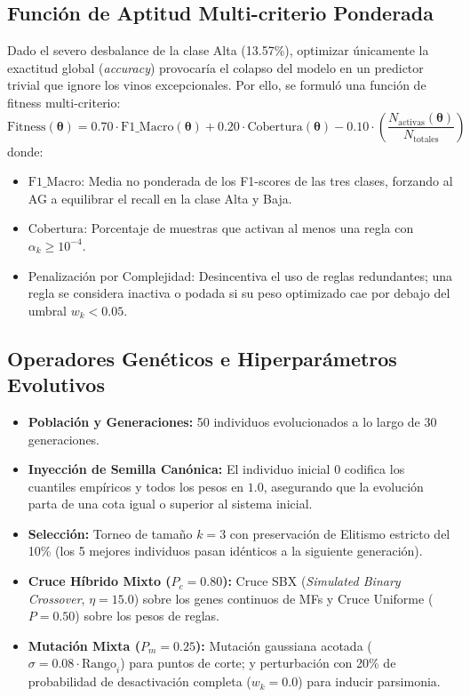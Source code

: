 \documentclass[11pt,a4paper]{article}
\begin{document}
\subsection{Función de Aptitud Multi-criterio Ponderada}
Dado el severo desbalance de la clase Alta (13.57\%), optimizar únicamente la exactitud global (\textit{accuracy}) provocaría el colapso del modelo en un predictor trivial que ignore los vinos excepcionales. Por ello, se formuló una función de fitness multi-criterio:
\begin{equation}
\text{Fitness}(\boldsymbol{\theta}) = 0.70 \cdot \text{F1\_Macro}(\boldsymbol{\theta}) + 0.20 \cdot \text{Cobertura}(\boldsymbol{\theta}) - 0.10 \cdot \left(\frac{N_{\text{activas}}(\boldsymbol{\theta})}{N_{\text{totales}}}\right)
\end{equation}
donde:
\begin{itemize}[noitemsep]
    \item $\text{F1\_Macro}$: Media no ponderada de los F1-scores de las tres clases, forzando al AG a equilibrar el recall en la clase Alta y Baja.
    \item $\text{Cobertura}$: Porcentaje de muestras que activan al menos una regla con $\alpha_k \ge 10^{-4}$.
    \item Penalización por Complejidad: Desincentiva el uso de reglas redundantes; una regla se considera inactiva o podada si su peso optimizado cae por debajo del umbral $w_k < 0.05$.
\end{itemize}

\subsection{Operadores Genéticos e Hiperparámetros Evolutivos}
\begin{itemize}[noitemsep]
    \item \textbf{Población y Generaciones:} 50 individuos evolucionados a lo largo de 30 generaciones.
    \item \textbf{Inyección de Semilla Canónica:} El individuo inicial 0 codifica los cuantiles empíricos y todos los pesos en $1.0$, asegurando que la evolución parta de una cota igual o superior al sistema inicial.
    \item \textbf{Selección:} Torneo de tamaño $k=3$ con preservación de Elitismo estricto del 10\% (los 5 mejores individuos pasan idénticos a la siguiente generación).
    \item \textbf{Cruce Híbrido Mixto ($P_c = 0.80$):} Cruce SBX (\textit{Simulated Binary Crossover}, $\eta = 15.0$) sobre los genes continuos de MFs y Cruce Uniforme ($P=0.50$) sobre los pesos de reglas.
    \item \textbf{Mutación Mixta ($P_m = 0.25$):} Mutación gaussiana acotada ($\sigma = 0.08 \cdot \text{Rango}_i$) para puntos de corte; y perturbación con 20\% de probabilidad de desactivación completa ($w_k = 0.0$) para inducir parsimonia.
\end{itemize}
\end{document}
